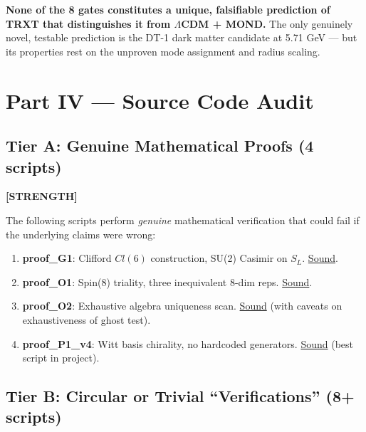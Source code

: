 \documentclass[12pt, a4paper]{article}
\newcommand{\positive}{\textcolor{positive}{\textbf{[STRENGTH]}}}
\begin{document}
\textbf{None of the 8 gates constitutes a unique, falsifiable prediction of TRXT that distinguishes it from $\Lambda$CDM + MOND.} The only genuinely novel, testable prediction is the DT-1 dark matter candidate at 5.71 GeV --- but its properties rest on the unproven mode assignment and radius scaling.

\section{Part IV --- Source Code Audit}

\subsection{Tier A: Genuine Mathematical Proofs (4 scripts)}
\positive{}

The following scripts perform \emph{genuine} mathematical verification that could fail if the underlying claims were wrong:

\begin{enumerate}
    \item \textbf{proof\_G1}: Clifford $Cl(6)$ construction, SU(2) Casimir on $S_L$. \underline{Sound}.
    \item \textbf{proof\_O1}: Spin(8) triality, three inequivalent 8-dim reps. \underline{Sound}.
    \item \textbf{proof\_O2}: Exhaustive algebra uniqueness scan. \underline{Sound} (with caveats on exhaustiveness of ghost test).
    \item \textbf{proof\_P1\_v4}: Witt basis chirality, no hardcoded generators. \underline{Sound} (best script in project).
\end{enumerate}

\subsection{Tier B: Circular or Trivial ``Verifications'' (8+ scripts)}
\end{document}
